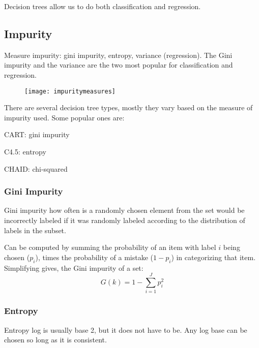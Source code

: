     \begin{qanda}

    \end{qanda}


Decision trees allow us to do both classification and regression.

	\subsection{Impurity}
Measure impurity: gini impurity, entropy, variance (regression).  The Gini impurity and the variance are the two most popular for classification and regression.

	\begin{figure}[tbp]
		\centering
		\texttt{[image: impuritymeasures]}
	\end{figure}

There are several decision tree types, mostly they vary based on the measure of impurity used.  Some popular ones are:
	\begin{bulletedlist}
		\item CART: gini impurity
		\item C4.5: entropy
		\item CHAID: chi-squared
	\end{bulletedlist}

	\subsubsection{Gini Impurity}
Gini impurity how often is a randomly chosen element from the set would be incorrectly labeled if it was randomly labeled according to the distribution of labels in the subset.

Can be computed by summing the probability of an item with label $i$ being chosen ($p_i$), times the probability of a mistake ($1-p_i$)
in categorizing that item.
Simplifying gives, the Gini impurity of a set:
	\begin{equation}
		G(k) = 1 - \sum_{i=1}^J p_i^2
	\end{equation}

	\subsubsection{Entropy}
Entropy log is usually base 2, but it does not have to be.  Any log base can be chosen so long as it is consistent.

